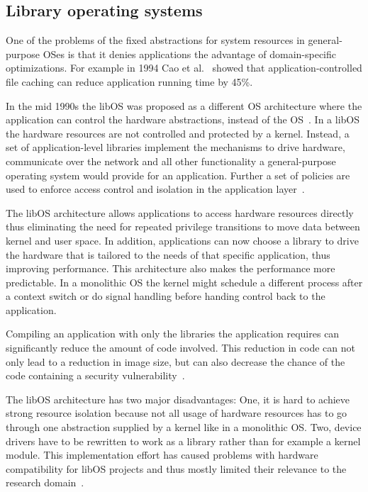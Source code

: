 \documentclass[10pt,twocolumn,a4paper]{article}
\begin{document}
  \subsection{Library operating systems}\label{sec:libOS}
    One of the problems of the fixed abstractions for system resources in general-purpose OSes
    is that it denies applications the advantage of domain-specific optimizations.
    For example in 1994 Cao et al.~\cite{cao94} showed that application-controlled file caching
    can reduce application running time by 45\%.

    In the mid 1990s the libOS was proposed as a different OS architecture
    where the application can control the hardware abstractions, instead of the OS~\cite{engler95}.
    In a libOS the hardware resources are not controlled and protected by a kernel.
    Instead, a set of application-level libraries implement the mechanisms to drive hardware,
    communicate over the network and all other functionality a general-purpose 
    operating system would provide for an application.
    Further a set of policies are used to enforce access control and isolation in the
    application layer~\cite{madhavapeddy13-2}.
    
    The libOS architecture allows applications to access hardware resources directly
    thus eliminating the need for repeated privilege transitions to move data
    between kernel and user space.
    In addition, applications can now choose a library to drive the hardware that is
    tailored to the needs of that specific application, thus improving performance.
    This architecture also makes the performance more predictable.
    In a monolithic OS the kernel might schedule a different process after a
    context switch or do signal handling before handing control back to the application.

    Compiling an application with only the libraries the application requires
    can significantly reduce the amount of code involved.
    This reduction in code can not only lead to a reduction in image size, 
    but can also decrease the chance of the code containing a 
    security vulnerability~\cite{madhavapeddy13}.

    The libOS architecture has two major disadvantages:   
    One, it is hard to achieve strong resource isolation because not all
    usage of hardware resources has to go through one abstraction supplied by
    a kernel like in a monolithic OS.
    Two, device drivers have to be rewritten to work as a library rather than
    for example a kernel module.
    This implementation effort has caused problems with hardware compatibility
    for libOS projects and thus mostly limited their relevance to the
    research domain~\cite{madhavapeddy13, raza19}.
\end{document}
